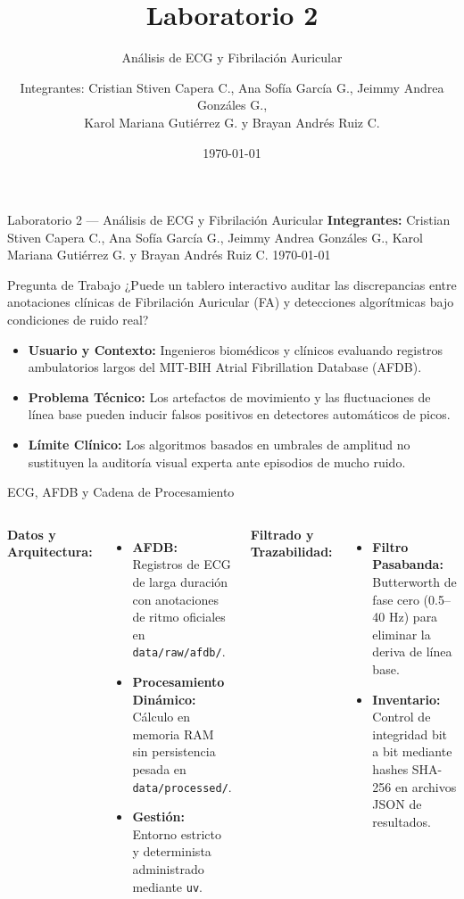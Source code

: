 \documentclass[aspectratio=169]{beamer}
\title{Laboratorio 2}
\subtitle{Análisis de ECG y Fibrilación Auricular}
\author{Integrantes: Cristian Stiven Capera C., Ana Sofía García G., Jeimmy Andrea Gonzáles G.,\\
Karol Mariana Gutiérrez G. y Brayan Andrés Ruiz C.}
\date{\today}
\begin{document}
\begin{frame}{Laboratorio 2 --- Análisis de ECG y Fibrilación Auricular}
    \scriptsize
    \textbf{Integrantes:} Cristian Stiven Capera C., Ana Sofía García G.,
    Jeimmy Andrea Gonzáles G., Karol Mariana Gutiérrez G. y Brayan Andrés Ruiz C.
    \hfill \today
    \vspace{0.15cm}
    \normalsize
    \begin{block}{Pregunta de Trabajo}
        ¿Puede un tablero interactivo auditar las discrepancias entre anotaciones clínicas de Fibrilación Auricular (FA) y detecciones algorítmicas bajo condiciones de ruido real?
    \end{block}
    \begin{itemize}
        \small
        \item \textbf{Usuario y Contexto:} Ingenieros biomédicos y clínicos evaluando registros ambulatorios largos del MIT-BIH Atrial Fibrillation Database (AFDB).
        \item \textbf{Problema Técnico:} Los artefactos de movimiento y las fluctuaciones de línea base pueden inducir falsos positivos en detectores automáticos de picos.
        \item \textbf{Límite Clínico:} Los algoritmos basados en umbrales de amplitud no sustituyen la auditoría visual experta ante episodios de mucho ruido.
    \end{itemize}
\end{frame}

\begin{frame}{ECG, AFDB y Cadena de Procesamiento}
    \begin{columns}[T]
        \textbf{Datos y Arquitectura:}
        \begin{itemize}
            \small
            \item \textbf{AFDB:} Registros de ECG de larga duración con anotaciones de ritmo oficiales en \texttt{data/raw/afdb/}.
            \item \textbf{Procesamiento Dinámico:} Cálculo en memoria RAM sin persistencia pesada en \texttt{data/processed/}.
            \item \textbf{Gestión:} Entorno estricto y determinista administrado mediante \texttt{uv}.
        \end{itemize}
        
        \textbf{Filtrado y Trazabilidad:}
        \begin{itemize}
            \small
            \item \textbf{Filtro Pasabanda:} Butterworth de fase cero (0.5--40 Hz) para eliminar la deriva de línea base.
            \item \textbf{Inventario:} Control de integridad bit a bit mediante hashes SHA-256 en archivos JSON de resultados.
        \end{itemize}
    \end{columns}
\end{frame}
\end{document}
